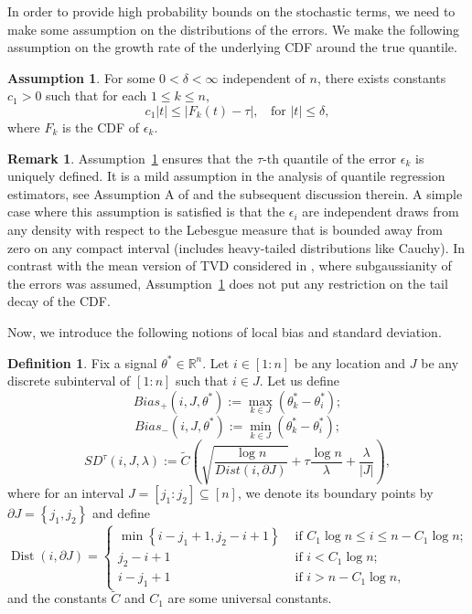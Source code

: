 \documentclass[11pt]{article}
\newcommand{\bR}{\mathbb{R}}
\theoremstyle{plain}
\theoremstyle{definition}
\newtheorem{definition}[theorem]{Definition}
\newtheorem{assumption}{Assumption}
\newtheorem{remark}{Remark}
\theoremstyle{remark}
\begin{document}
In order to provide high probability bounds on the stochastic terms, we need to make some assumption on the distributions of the errors. We make the following assumption on the growth rate of the underlying CDF around the true quantile.
\begin{assumption}\label{ass:growth_condn}
   For some $0<\delta<\infty$ independent of $n$, there exists  constants $c_1>0$ such that for each $1\leq k \leq n$,
    \[c_1|t|\leq |F_k(t)-\tau|,\;\;\text{ for } |t|\leq \delta,\]
    where $F_k$ is the CDF of $\epsilon_k$.
\end{assumption}
    \begin{remark}
        Assumption~\ref{ass:growth_condn} ensures that the $\tau$-th quantile of the error $\epsilon_k$ is uniquely defined. It is a mild assumption in the analysis of quantile regression estimators, see Assumption A of \cite{madrid2022risk} and the subsequent discussion therein. A simple case where this assumption is satisfied is
that the $\epsilon_i$ are independent draws from any density with respect to the Lebesgue measure that is bounded away
from zero on any compact interval (includes heavy-tailed distributions like Cauchy). In contrast with the mean version of TVD considered in \cite{chatterjee2026minmaxtrendfilteringgeneralizations}, where subgaussianity of the errors was assumed, Assumption~\ref{ass:growth_condn} does not put any restriction on the tail decay of the CDF.
    \end{remark}
Now, we introduce the following notions of local bias and standard deviation. 
\begin{definition}\label{defn:local_bias_sd}
    Fix a signal $\theta^* \in \bR^n$. Let $i\in [1:n]$ be any location and $J$ be any discrete subinterval of $[1:n]$ such that $i \in J$. Let us define
    \[Bias_+(i,J,\theta^*):=\max_{k \in J}(\theta^*_k-\theta^*_i);\]
    \[Bias_-(i,J,\theta^*):=\min_{k \in J}(\theta^*_k-\theta^*_i);\]
    \[SD^{\tau}(i,J,\lambda):=\tilde{C}\left(\sqrt{\frac{\log n}{Dist(i,\partial J)}}+\tau \frac{\log n}{\lambda}+\frac{\lambda}{|J|}\right),\]
    where for an interval $J=\left[j_1: j_2\right] \subseteq[n]$, we denote its boundary points by $\partial J=\left\{j_1, j_2\right\}$ and define
$$
\operatorname{Dist}(i, \partial J)=\begin{cases}
    \min \left\{i-j_1+1, j_2-i+1\right\} & \text{ if } C_1 \log n\leq i \leq n-C_1 \log n;\\
     j_2-i+1 & \text{ if } i<C_1 \log n;\\
    i-j_1+1 & \text{ if }i >n-C_1 \log n,
\end{cases} 
$$
and the constants $\tilde{C}$ and $C_1$ are some universal constants.
\end{definition}
\end{document}
